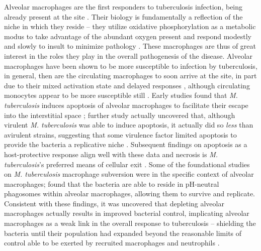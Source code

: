 Alveolar macrophages are the first responders to tuberculosis infection, being already present at the site \citep{Flynn2001}. Their biology is fundamentally a reflection of the niche in which they reside -- they utilize oxidative phosphorylation as a metabolic modus to take advantage of the abundant oxygen present and respond modestly and slowly to insult to minimize pathology \citep{Joshi2018}. These macrophages are thus of great interest in the roles they play in the overall pathogenesis of the disease. Alveolar macrophages have been shown to be more susceptible to infection by tuberculosis, in general, then are the circulating macrophages to soon arrive at the site, in part due to their mixed activation state and delayed responses \citep{Kahnert2006, Madden2022}, although circulating monocytes appear to be more susceptible still \citep{Cambier2014b, Cambier2017}. Early studies found that \textit{M. tuberculosis} induces apoptosis of alveolar macrophages to facilitate their escape into the interstitial space \citep{Keane1997}; further study actually uncovered that, although virulent \textit{M. tuberculosis} was able to induce apoptosis, it actually did so \textit{less} than avirulent strains, suggesting that some virulence factor limited apoptosis to provide the bacteria a replicative niche \citep{Keane2000, Cohen2018}. Subsequent findings on apoptosis as a host\hyp{}protective response align well with these data and necrosis is \textit{M. tuberculosis}'s preferred means of cellular exit \citep{Behar2011}. Some of the foundational studies on \textit{M. tuberculosis} macrophage subversion were in the specific context of alveolar macrophages; \citeauthor{Mwandumba2004} found that the bacteria are able to reside in pH\hyp{}neutral phagosomes within alveolar macrophages, allowing them to survive and replicate. Consistent with these findings, it was uncovered that depleting alveolar macrophages actually results in improved bacterial control, implicating alveolar macrophages as a weak link in the overall response to tuberculosis -- shielding the bacteria until their population had expanded beyond the reasonable limits of control able to be exerted by recruited macrophages and neutrophils \citep{Leemans2001}. 

